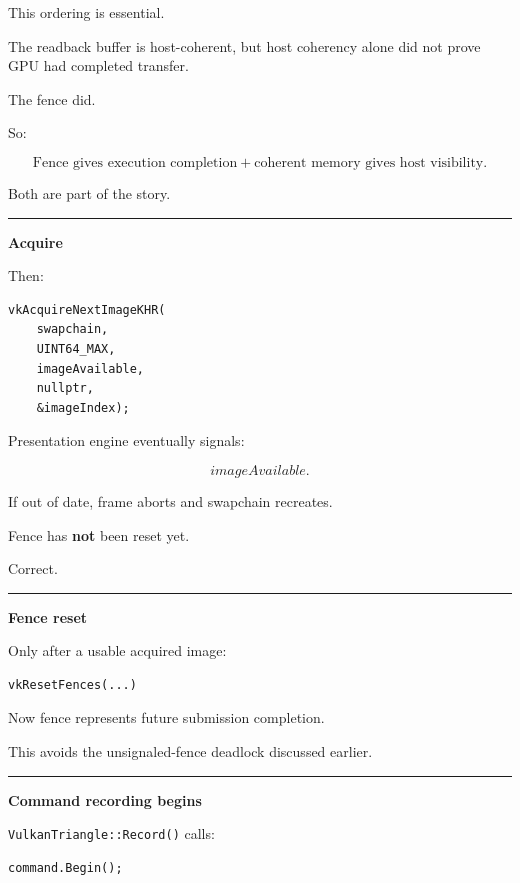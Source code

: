 This ordering is essential.

The readback buffer is host-coherent, but host coherency alone did not prove GPU had completed transfer.

The fence did.

So:

\[
\boxed{
\text{Fence gives execution completion}
+
\text{coherent memory gives host visibility}.
}
\]

Both are part of the story.

\begin{center}\rule{0.5\linewidth}{0.5pt}\end{center}

\textbf{Acquire}

Then:

\begin{verbatim}
vkAcquireNextImageKHR(
    swapchain,
    UINT64_MAX,
    imageAvailable,
    nullptr,
    &imageIndex);
\end{verbatim}

Presentation engine eventually signals:

\[
imageAvailable.
\]

If out of date, frame aborts and swapchain recreates.

Fence has \textbf{not} been reset yet.

Correct.

\begin{center}\rule{0.5\linewidth}{0.5pt}\end{center}

\textbf{Fence reset}

Only after a usable acquired image:

\begin{verbatim}
vkResetFences(...)
\end{verbatim}

Now fence represents future submission completion.

This avoids the unsignaled-fence deadlock discussed earlier.

\begin{center}\rule{0.5\linewidth}{0.5pt}\end{center}

\textbf{Command recording begins}

\texttt{VulkanTriangle::Record()} calls:

\begin{verbatim}
command.Begin();
\end{verbatim}

